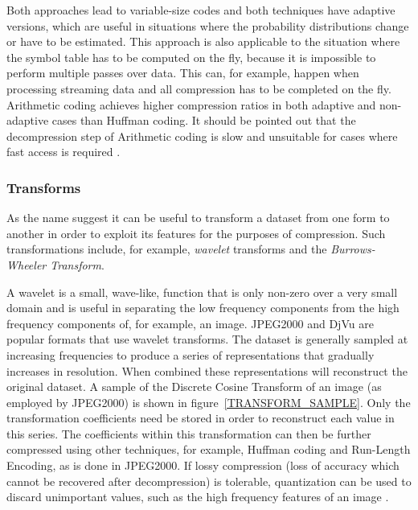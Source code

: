 Both approaches lead to variable-size codes and both techniques have adaptive versions, which are useful in situations where the probability distributions change or have to be estimated. 
This approach is also applicable to the situation where the symbol table has to be computed on the fly, because it is impossible to perform multiple passes over data. This can, for example,
happen when processing streaming data and all compression has to be completed on the fly. Arithmetic coding achieves higher compression ratios in both adaptive and non-adaptive cases 
than Huffman coding. It should be pointed out that the decompression step of Arithmetic coding is slow and unsuitable for cases where fast access is 
required \cite{ray1995database,williams1999compressing}\cite[ch. 2]{salomon2004data}.
\subsubsection{Transforms}
As the name suggest it can be useful to transform a dataset from one form to another in order to exploit its features for the purposes of compression. Such transformations 
include, for example, \textit{wavelet} transforms and the \textit{Burrows-Wheeler Transform}. 

A wavelet is a small, wave-like, function that is only non-zero over a very small domain and is useful in separating the low frequency components from the high frequency components of, 
for example, an image. JPEG2000 and DjVu are popular formats that use wavelet transforms. The dataset is generally sampled at increasing frequencies to produce a series of representations 
that gradually increases in resolution. When combined these representations will reconstruct the original dataset. A sample of the Discrete Cosine Transform of an image (as employed by JPEG2000) 
is shown in figure~\ref{TRANSFORM_SAMPLE}. Only the transformation coefficients need be stored in order to reconstruct each value in this series. The coefficients within this transformation 
can then be further compressed using other techniques, for example, Huffman coding and Run-Length Encoding, as is done in JPEG2000. If lossy compression (loss of accuracy which cannot be recovered after 
decompression) is tolerable, quantization can be used to discard unimportant values, such as the high frequency features of an image \cite{952804}\cite[ch. 5]{salomon2004data}.

